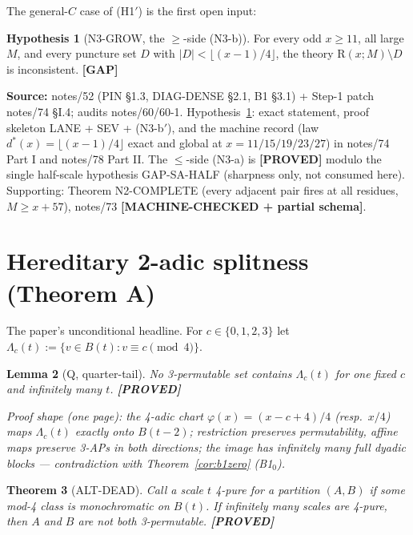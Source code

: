 \documentclass[11pt]{article}
\newtheorem{theorem}{Theorem}
\newtheorem{lemma}[theorem]{Lemma}
\theoremstyle{definition}
\newtheorem{hypothesis}[theorem]{Hypothesis}
\newcommand{\Rung}{\mathrm{R}}
\newcommand{\source}[1]{\par\smallskip\noindent\textbf{Source:} {#1}\par}
\newcommand{\status}[1]{\textbf{[#1]}}
\begin{document}
The general-$C$ case of (H1$'$) is the first open input:

\begin{hypothesis}[N3-GROW, the $\ge$-side (N3-b)]\label{hyp:n3grow}
For every odd $x \ge 11$, all large $M$, and every puncture set $D$ with
$|D| < \lfloor (x-1)/4 \rfloor$, the theory $\Rung(x; M) \setminus D$ is
inconsistent.  \status{GAP}
\end{hypothesis}

\source{notes/52 (PIN \S1.3, DIAG-DENSE \S2.1, B1 \S3.1) + Step-1 patch
notes/74 \S I.4; audits notes/60/60-1.  Hypothesis~\ref{hyp:n3grow}: exact
statement, proof skeleton LANE + SEV + (N3-b$'$), and the machine record
(law $d^*(x) = \lfloor (x-1)/4 \rfloor$ exact and global at
$x = 11/15/19/23/27$) in notes/74 Part I and notes/78 Part II.  The
$\le$-side (N3-a) is \status{PROVED} modulo the single half-scale
hypothesis GAP-SA-HALF (sharpness only, not consumed here).  Supporting:
Theorem N2-COMPLETE (every adjacent pair fires at all residues,
$M \ge x + 57$), notes/73 \status{MACHINE-CHECKED + partial schema}.}

\section{Hereditary 2-adic splitness (Theorem A)}\label{sec:chart}

The paper's unconditional headline.  For $c \in \{0,1,2,3\}$ let
$\Lambda_c(t) := \{ v \in B(t) : v \equiv c \pmod 4 \}$.

\begin{lemma}[Q, quarter-tail]\label{lem:q}
No 3-permutable set contains $\Lambda_c(t)$ for one fixed $c$ and infinitely
many $t$.  \status{PROVED}
\end{lemma}

\noindent\emph{Proof shape (one page): the 4-adic chart
$\varphi(x) = (x - c + 4)/4$ (resp.\ $x/4$) maps $\Lambda_c(t)$ exactly onto
$B(t-2)$; restriction preserves permutability, affine maps preserve 3-APs in
both directions; the image has infinitely many full dyadic blocks ---
contradiction with Theorem~\ref{cor:b1zero} (B1$_0$).}

\begin{theorem}[ALT-DEAD]\label{thm:altdead}
Call a scale $t$ \emph{4-pure} for a partition $(A,B)$ if some mod-4 class
is monochromatic on $B(t)$.  If infinitely many scales are 4-pure, then $A$
and $B$ are not both 3-permutable.  \status{PROVED}
\end{theorem}
\end{document}
